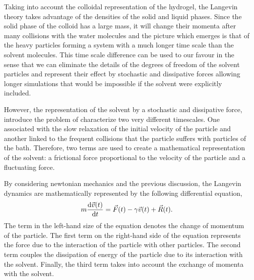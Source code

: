 
Taking into account the colloidal representation of the hydrogel, the Langevin theory takes advantage of the densities of the solid and liquid phases.
Since the solid phase of the colloid has a large mass, it will change their momenta after many collisions with the water molecules and the picture which emerges is that of the heavy particles forming a system with a much longer time scale than the solvent molecules\citep{Thijssen2007}.
This time scale difference can be used to our favour in the sense that we can eliminate the details of the degrees of freedom of the solvent particles and represent their effect by stochastic and dissipative forces allowing longer simulations that would be impossible if the solvent were explicitly included\citep{pastorTechniquesApplicationsLangevin1994}.

However, the representation of the solvent by a stochastic and dissipative force, introduce the problem of characterize two very different timescales.
One associated with the slow relaxation of the initial velocity of the particle and another linked to the frequent collisions that the particle suffers with particles of the bath\citep{tsl2006}. 
Therefore, two terms are used to create a mathematical representation of the solvent: a frictional force proportional to the velocity of the particle and a fluctuating force. 

By considering newtonian mechanics and the previous discussion, the Langevin dynamics are mathematically represented by the following differential equation,
\begin{gather}
    m\dv{\vec{v}(t)}{t}=\vec{F}(t)-\gamma\vec{v}(t)+\vec{R}(t).\label{eqn:BrownianDyn1}
\end{gather}
The term in the left-hand size of the equation denotes the change of momentum of the particle.
The first term on the right-hand side of the equation represents the force due to the interaction of the particle with other particles.
The second term couples the dissipation of energy of the particle due to its interaction with the solvent.
Finally, the third term takes into account the exchange of momenta with the solvent.

